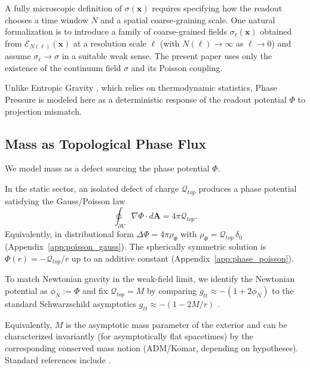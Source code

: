 \begin{remark}
A fully microscopic definition of $\sigma(\mathbf{x})$ requires specifying how the readout chooses a time window $N$ and a spatial coarse-graining scale. One natural formalization is to introduce a family of coarse-grained fields $\sigma_\ell(\mathbf{x})$ obtained from $\mathcal{E}_{N(\ell)}(\mathbf{x})$ at a resolution scale $\ell$ (with $N(\ell)\to\infty$ as $\ell\to 0$) and assume $\sigma_\ell\to\sigma$ in a suitable weak sense. The present paper uses only the existence of the continuum field $\sigma$ and its Poisson coupling.
\end{remark}

Unlike Entropic Gravity \cite{Verlinde2011}, which relies on thermodynamic statistics, Phase Pressure is modeled here as a deterministic response of the readout potential $\Phi$ to projection mismatch.

\subsection{Mass as Topological Phase Flux}
We model mass as a defect sourcing the phase potential $\Phi$.

\begin{axiom}
\label{ax:phase_gauss}
In the static sector, an isolated defect of charge $\mathcal{Q}_{top}$ produces a phase potential satisfying the Gauss/Poisson law
\begin{equation}
  \oint_{\partial V} \nabla \Phi \cdot d\mathbf{A} = 4\pi \mathcal{Q}_{top}.
\end{equation}
Equivalently, in distributional form $\Delta \Phi = 4\pi \rho_\Phi$ with $\rho_\Phi=\mathcal{Q}_{top}\,\delta_0$ (Appendix~\ref{app:poisson_gauss}). The spherically symmetric solution is $\Phi(r)=-\mathcal{Q}_{top}/r$ up to an additive constant (Appendix~\ref{app:phase_poisson}).
\end{axiom}

To match Newtonian gravity in the weak-field limit, we identify the Newtonian potential as $\phi_N:=\Phi$ and fix $\mathcal{Q}_{top}=M$ by comparing $g_{tt}\approx -(1+2\phi_N)$ to the standard Schwarzschild asymptotics $g_{tt}\approx -(1-2M/r)$ \cite{Schwarzschild1916}.

\begin{remark}
Equivalently, $M$ is the asymptotic mass parameter of the exterior and can be characterized invariantly (for asymptotically flat spacetimes) by the corresponding conserved mass notion (ADM/Komar, depending on hypotheses). Standard references include \cite{Wald1984,Poisson2004}.
\end{remark}

